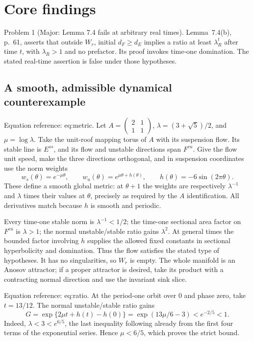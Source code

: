 \documentclass[10pt]{article}
\begin{document}
\section*{Core findings}
Problem 1 (Major: Lemma 7.4 fails at arbitrary real times).  Lemma 7.4(b), p. 61, asserts that outside \(W_r\), initial \(d_F\ge d_E\) implies a ratio at least \(\lambda_R^t\) after time \(t\), with \(\lambda_R>1\) and no prefactor. Its proof invokes time-one domination. The stated real-time assertion is false under those hypotheses.\par
\subsection*{A smooth, admissible dynamical counterexample}
Equation reference: eq:metric. Let \(A=\left(\begin{smallmatrix}2&1\\1&1\end{smallmatrix}\right)\), \(\lambda=(3+\sqrt5)/2\), and \(\mu=\log\lambda\). Take the unit-roof mapping torus of \(A\) with its suspension flow. Its stable line is \(E^{ss}\), and its flow and unstable directions span \(F^{cu}\). Give the flow unit speed, make the three directions orthogonal, and in suspension coordinates use the norm weights \[w_s(\theta)=e^{-\mu\theta},\qquad
 w_u(\theta)=e^{\mu\theta+h(\theta)},\qquad
 h(\theta)=-6\sin(2\pi\theta).
 \] These define a smooth global metric: at \(\theta+1\) the weights are respectively \(\lambda^{-1}\) and \(\lambda\) times their values at \(\theta\), precisely as required by the \(A\) identification. All derivatives match because \(h\) is smooth and periodic.\par
Every time-one stable norm is \(\lambda^{-1}<1/2\); the time-one sectional area factor on \(F^{cu}\) is \(\lambda>1\); the normal unstable/stable ratio gains \(\lambda^2\). At general times the bounded factor involving \(h\) supplies the allowed fixed constants in sectional hyperbolicity and domination. Thus the flow satisfies the stated type of hypotheses. It has no singularities, so \(W_r\) is empty. The whole manifold is an Anosov attractor; if a proper attractor is desired, take its product with a contracting normal direction and use the invariant sink slice.\par
Equation reference: eq:ratio. At the period-one orbit over \(0\) and phase zero, take \(t=13/12\). The normal unstable/stable ratio gains \[G=\exp\{2\mu t+h(t)-h(0)\}
   =\exp(13\mu/6-3)<e^{-2/5}<1.
 \] Indeed, \(\lambda<3<e^{6/5}\), the last inequality following already from the first four terms of the exponential series. Hence \(\mu<6/5\), which proves the strict bound.\par
\end{document}
